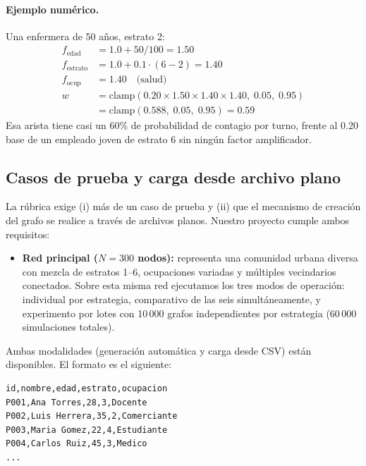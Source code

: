 \documentclass[spanish,notitlepage,letterpaper, 12pt]{article}
\begin{document}
\paragraph{Ejemplo num\'erico.} Una enfermera de 50 a\~nos, estrato 2:
\begin{align*}
f_{\text{edad}} &= 1.0 + 50/100 = 1.50 \\
f_{\text{estrato}} &= 1.0 + 0.1 \cdot (6 - 2) = 1.40 \\
f_{\text{ocup}} &= 1.40 \quad \text{(salud)} \\
w &= \text{clamp}(0.20 \times 1.50 \times 1.40 \times 1.40, \; 0.05, \; 0.95) \\
  &= \text{clamp}(0.588, \; 0.05, \; 0.95) = 0.59
\end{align*}
Esa arista tiene casi un 60\% de probabilidad de contagio por turno, frente al 0.20 base de un empleado joven de estrato 6 sin ning\'un factor amplificador.

\subsection{Casos de prueba y carga desde archivo plano}

La r\'ubrica exige (i) m\'as de un caso de prueba y (ii) que el mecanismo de creaci\'on del grafo se realice a trav\'es de archivos planos. Nuestro proyecto cumple ambos requisitos:

\begin{itemize}[leftmargin=*]
    \item \textbf{Red principal ($N = 300$ nodos):} representa una comunidad urbana diversa con mezcla de estratos 1--6, ocupaciones variadas y m\'ultiples vecindarios conectados. Sobre esta misma red ejecutamos los tres modos de operaci\'on: individual por estrategia, comparativo de las seis simult\'aneamente, y experimento por lotes con 10\,000 grafos independientes por estrategia (60\,000 simulaciones totales).
\end{itemize}

Ambas modalidades (generaci\'on autom\'atica y carga desde CSV) est\'an disponibles. El formato es el siguiente:

\begin{lstlisting}[language={}, caption={Formato de \texttt{personas\_red.csv}.}]
id,nombre,edad,estrato,ocupacion
P001,Ana Torres,28,3,Docente
P002,Luis Herrera,35,2,Comerciante
P003,Maria Gomez,22,4,Estudiante
P004,Carlos Ruiz,45,3,Medico
...
\end{lstlisting}
\end{document}
